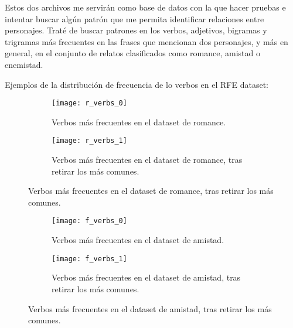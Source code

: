 \documentclass{pre-tfg}
\begin{document}
Estos dos archivos me servirán como base de datos con la que hacer pruebas e intentar buscar algún patrón que me permita identificar relaciones entre personajes. Traté de buscar patrones en los verbos, adjetivos, bigramas y trigramas más frecuentes en las frases que mencionan dos personajes, y más en general, en el conjunto de relatos clasificados como romance, amistad o enemistad.

Ejemplos de la distribución de frecuencia de lo verbos en el RFE dataset:

\begin{figure}
	\centering
	\begin{subfigure}{\textwidth}
		\texttt{[image: r\_verbs\_0]}
		\caption{Verbos más frecuentes en el dataset de romance.}
		\label{fig:r_verb_freq_in_dataset}
		
	\end{subfigure}
	\begin{subfigure}{\textwidth}
		\texttt{[image: r\_verbs\_1]}
		\caption{Verbos más frecuentes en el dataset de romance, tras retirar los más comunes.}
		\label{fig:r_verb_freq_removed}
	\end{subfigure}
	
	
\end{figure}


\begin{figure}
	\centering
	\begin{subfigure}{\textwidth}
		\texttt{[image: f\_verbs\_0]}
		\caption{Verbos más frecuentes en el dataset de amistad.}
		\label{fig:f_verb_freq_in_dataset}
		
	\end{subfigure}
	\begin{subfigure}{\textwidth}
		\texttt{[image: f\_verbs\_1]}
		\caption{Verbos más frecuentes en el dataset de amistad, tras retirar los más comunes.}
		\label{fig:f_verb_freq_removed}
	\end{subfigure}
	
	
\end{figure}
\end{document}
